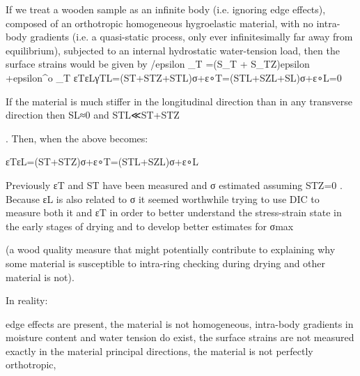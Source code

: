 If we treat a wooden sample as an infinite body (i.e. ignoring edge effects), composed of an orthotropic homogeneous hygroelastic material, with no intra-body gradients (i.e. a quasi-static process, only ever infinitesimally far away from equilibrium), subjected to an internal hydrostatic water-tension load, then the surface strains would be given by
/epsilon _T =(S_T + S_TZ)epsilon +epsilon^o _T  
εTεLγTL=(ST+STZ+STL)σ+ε∘T=(STL+SZL+SL)σ+ε∘L=0

If the material is much stiffer in the longitudinal direction than in any transverse direction then SL≈0
and STL≪ST+STZ

. Then, when the above becomes:

εTεL=(ST+STZ)σ+ε∘T=(STL+SZL)σ+ε∘L

Previously εT
and ST have been measured and σ estimated assuming STZ=0 . Because εL is also related to σ it seemed worthwhile trying to use DIC to measure both it and εT in order to better understand the stress-strain state in the early stages of drying and to develop better estimates for σmax

(a wood quality measure that might potentially contribute to explaining why some material is susceptible to intra-ring checking during drying and other material is not).

In reality:

    edge effects are present,
    the material is not homogeneous,
    intra-body gradients in moisture content and water tension do exist,
    the surface strains are not measured exactly in the material principal directions,
    the material is not perfectly orthotropic,